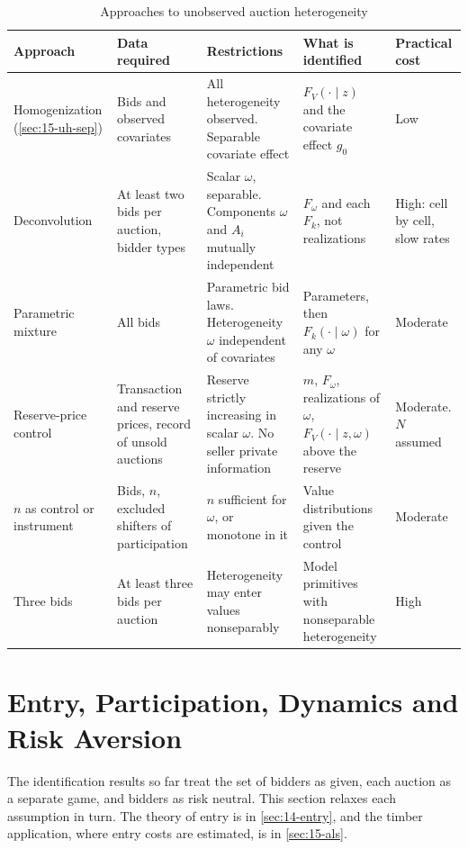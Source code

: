 \begin{table}[htbp]
\centering
\caption{Approaches to unobserved auction heterogeneity}
\label{tab:15-uh-approaches}
{\footnotesize
\begin{tabularx}{\textwidth}{>{\raggedright\arraybackslash}p{2.35cm}>{\raggedright\arraybackslash}X>{\raggedright\arraybackslash}X>{\raggedright\arraybackslash}X>{\raggedright\arraybackslash}p{2.3cm}}
\toprule
Approach & Data required & Restrictions & What is identified & Practical cost\\
\midrule
Homogenization (\cref{sec:15-uh-sep}) & Bids and observed covariates & All heterogeneity observed. Separable covariate effect & $F_V(\cdot\mid z)$ and the covariate effect $g_0$ & Low\\
Deconvolution \citep{Krasnokutskaya2011} & At least two bids per auction, bidder types & Scalar $\omega$, separable. Components $\omega$ and $A_i$ mutually independent & $F_\omega$ and each $F_k$, not realizations & High: cell by cell, slow rates\\
Parametric mixture \citep{AtheyLevinSeira2011} & All bids & Parametric bid laws. Heterogeneity $\omega$ independent of covariates & Parameters, then $F_k(\cdot\mid\omega)$ for any $\omega$ & Moderate\\
Reserve-price control \citep{Roberts2013} & Transaction and reserve prices, record of unsold auctions & Reserve strictly increasing in scalar $\omega$. No seller private information & $m$, $F_\omega$, realizations of $\omega$, $F_V(\cdot\mid z,\omega)$ above the reserve & Moderate. $N$ assumed\\
$n$ as control or instrument \citep{CampoPerrigneVuong2003,HaileHongShum2003} & Bids, $n$, excluded shifters of participation & $n$ sufficient for $\omega$, or monotone in it & Value distributions given the control & Moderate\\
Three bids \citep{HuMcAdamsShum2013} & At least three bids per auction & Heterogeneity may enter values nonseparably & Model primitives with nonseparable heterogeneity & High\\
\bottomrule
\end{tabularx}}
\end{table}

\section{Entry, Participation, Dynamics and Risk Aversion}\label{sec:15-entry}

The identification results so far treat the set of bidders as given, each auction as a separate game,
and bidders as risk neutral. This section relaxes each assumption in turn. The theory of entry is in
\cref{sec:14-entry}, and the timber application, where entry costs are estimated, is in
\cref{sec:15-als}.

